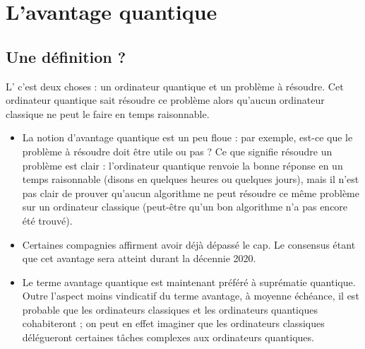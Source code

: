 \documentclass[11pt,class=report,crop=false]{standalone}
\begin{document}




\section{L'avantage quantique}


\subsection{Une définition ?}

L' c'est deux choses : un ordinateur quantique et un problème à résoudre. Cet ordinateur quantique sait résoudre ce problème alors qu'aucun ordinateur classique ne peut le faire en temps raisonnable.

\medskip

\begin{itemize}
  \item La notion d'avantage quantique est un peu floue : par exemple, est-ce que le problème à résoudre doit être utile ou pas ? 
Ce que signifie résoudre un problème est clair : l'ordinateur quantique renvoie la bonne réponse en un temps raisonnable (disons en quelques heures ou quelques jours), mais il n'est pas clair de prouver qu'aucun algorithme ne peut résoudre ce même problème sur un ordinateur classique (peut-être qu'un bon algorithme n'a pas encore été trouvé).

  \item Certaines compagnies affirment avoir déjà dépassé le cap. Le consensus étant que cet avantage sera atteint durant la décennie 2020.

  \item Le terme \og{}avantage quantique\fg{} est maintenant préféré à \og{}suprématie quantique\fg{}. 
Outre l'aspect moins vindicatif du terme \og{}avantage\fg{}, à moyenne échéance, il est probable que les ordinateurs classiques et les ordinateurs quantiques cohabiteront ; on peut en effet imaginer que les ordinateurs classiques délégueront certaines tâches complexes aux ordinateurs quantiques.
\end{itemize}
\end{document}
